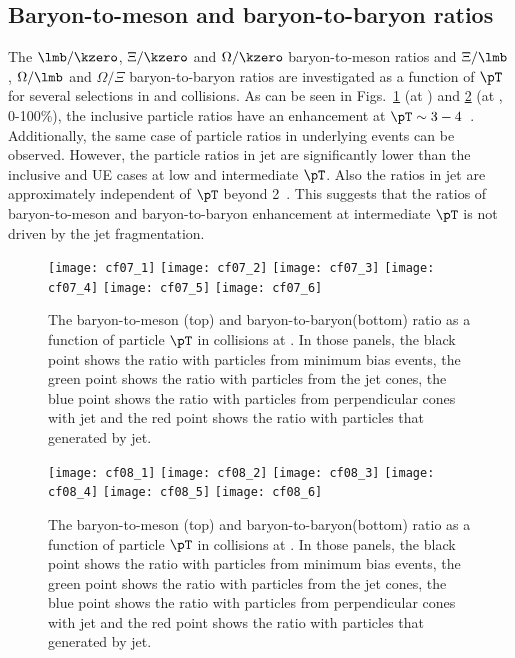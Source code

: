 \subsection{Baryon-to-meson and baryon-to-baryon ratios}
\label{subsec:ParRatios}
The $\lmb/\kzero$, $\Xi/\kzero$ and $\Omega/\kzero$ baryon-to-meson ratios and $\Xi/\lmb$, $\Omega/\lmb$ and $\Omega/\Xi$ baryon-to-baryon ratios are investigated as a function of $\pT$ for several selections in \pp and \pPb collisions. As can be seen in Figs.~\ref{fig:ppRatio} (\pp at \thirteen) and \ref{fig:pPbRatio} (\pPb at \fivenn, 0-100\%), the inclusive particle ratios have an enhancement at $\pT \sim 3 - 4 $~\GeVc. Additionally, the same case of particle ratios in underlying events can be observed. However, the particle ratios in jet are significantly lower than the inclusive and UE cases at low and intermediate $\pT$. Also the ratios in jet are approximately independent of $\pT$ beyond 2~\GeVc. This suggests that the ratios of baryon-to-meson and baryon-to-baryon enhancement at intermediate $\pT$ is not driven by the jet fragmentation.

\begin{figure}[!ht]
	\begin{center}
		\texttt{[image: cf07\_1]}
		\texttt{[image: cf07\_2]}
		\texttt{[image: cf07\_3]}
		\texttt{[image: cf07\_4]}
		\texttt{[image: cf07\_5]}
		\texttt{[image: cf07\_6]}
	\end{center}
	\caption{The baryon-to-meson (top) and baryon-to-baryon(bottom) ratio as a function of particle $\pT$ in \pp collisions at \thirteen. In those panels, the black point shows the ratio with particles from minimum bias events, the green point shows the ratio with particles from the jet cones, the blue point shows the ratio with particles from perpendicular cones with jet and the red point shows the ratio with particles that generated by jet.}
	\label{fig:ppRatio}
\end{figure}
\begin{figure}[!ht]
	\begin{center}
		\texttt{[image: cf08\_1]}
		\texttt{[image: cf08\_2]}
		\texttt{[image: cf08\_3]}
		\texttt{[image: cf08\_4]}
		\texttt{[image: cf08\_5]}
		\texttt{[image: cf08\_6]}
	\end{center}
	\caption{The baryon-to-meson (top) and baryon-to-baryon(bottom) ratio as a function of particle $\pT$ in \pPb collisions at \fivenn. In those panels, the black point shows the ratio with particles from minimum bias events, the green point shows the ratio with particles from the jet cones, the blue point shows the ratio with particles from perpendicular cones with jet and the red point shows the ratio with particles that generated by jet.}
	\label{fig:pPbRatio}
\end{figure}

